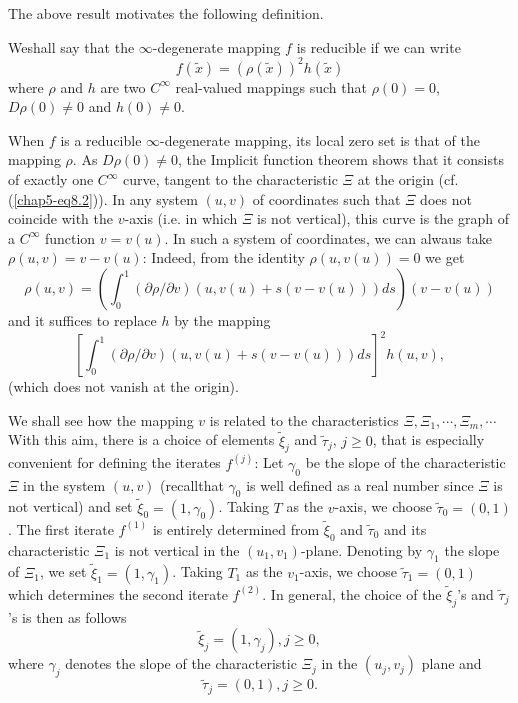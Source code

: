 The above result motivates the following definition.

\begin{definition}\label{chap5-def8.2}
We\pageoriginale shall say that the $\infty$-degenerate mapping $f$ is
reducible if we can write
\begin{equation*}
f(\widetilde{x}) = (\rho(\widetilde{x}))^{2} h(\widetilde{x})\tag{8.3}\label{chap5-eq8.3}
\end{equation*}
where $\rho$ and $h$ are two $C^{\infty}$ real-valued mappings such
that $\rho(0) = 0$, $D\rho(0) \neq 0$ and $h(0) \neq 0$.
\end{definition}

When $f$ is a reducible $\infty$-degenerate mapping, its local zero set
is that of the mapping $\rho$. As $D\rho(0) \neq 0$, the Implicit
function theorem shows that it consists of exactly one $C^{\infty}$
curve, tangent to the characteristic $\Xi$ at the origin
(cf. (\ref{chap5-eq8.2})). In any system $(u, v)$ of coordinates such
that $\Xi$ does not coincide with the $v$-axis (i.e. in which $\Xi$ is
not vertical), this curve is the graph of a $C^{\infty}$ function $v =
v(u)$. In such a system of coordinates, we can alwaus take $\rho(u, v)
= v - v(u)$: Indeed, from the identity $\rho(u, v(u)) = 0$ we get
$$
\rho(u, v) = \left(\int_{0}^{1} (\partial \rho / \partial v) (u, v(u)
+ s(v - v(u)))ds \right) (v - v(u))
$$
and it suffices to replace $h$ by the mapping
$$
\left[\int_{0}^{1} (\partial \rho / \partial v) (u, v(u) + s(v -
  v(u)))ds\right]^{2} h(u, v),
$$
(which does not vanish at the origin).

We shall see how the mapping $v$ is related to the characteristics $\Xi,
\Xi_{1}, \cdots, \Xi_{m}, \cdots$ With this aim, there is a choice of
elements $\widetilde{\xi}_{j}$ and $\widetilde{\tau}_{j}$, $j \geq 0$,
that is especially convenient for defining the iterates $f^{(j)}$:
Let $\gamma_{0}$ be the slope of the characteristic $\Xi$ in the
system $(u, v)$ (recall\pageoriginale that $\gamma_{0}$ is well
defined as a real number since $\Xi$ is not vertical) and set
$\widetilde{\xi}_{0} = (1, \gamma_{0})$. Taking $T$ as the $v$-axis, we
choose $\widetilde{\tau}_{0} = (0, 1)$. The first iterate $f^{(1)}$ is
entirely determined from $\widetilde{\xi}_{0}$ and
$\widetilde{\tau}_{0}$ and its characteristic $\Xi_{1}$ is not
vertical in the $(u_{1}, v_{1})$-plane. Denoting by $\gamma_{1}$ the
slope of $\Xi_{1}$, we set $\widetilde{\xi}_{1} = (1,
\gamma_{1})$. Taking $T_{1}$ as the $v_{1}$-axis, we choose
$\widetilde{\tau}_{1} = (0, 1)$ which determines the second iterate
$f^{(2)}$. In general, the choice of the $\widetilde{\xi}_{j}$'s and
$\widetilde{\tau}_{j}$'s is then as follows
\begin{equation*}
\widetilde{\xi}_{j} = (1, \gamma_{j}), j \geq 0,\tag{8.4}\label{chap5-eq8.4}
\end{equation*}
where $\gamma_{j}$ denotes the slope of the characteristic $\Xi_{j}$
in the $(u_{j}, v_{j})$ plane and
\begin{equation*}
\widetilde{\tau}_{j} = (0, 1), j \geq 0.\tag{8.5}\label{chap5-eq8.5}
\end{equation*}

